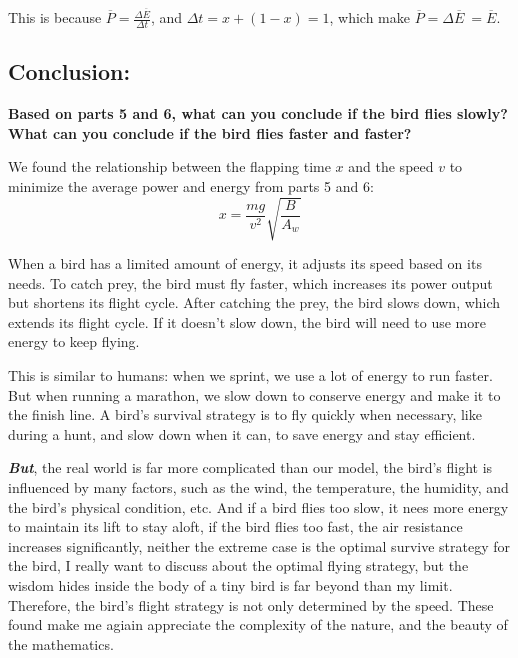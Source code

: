 \documentclass{article}
\begin{document}
This is because \(\overline{P}= \frac{{\Delta \overline{E}}}{\Delta t}\), and \(\Delta t = x + (1-x) =1\), which make \(\overline{P} = \Delta \overline{E}\ = \overline{E}\).

\subsection*{Conclusion:}
{\large \bfseries Based on parts 5 and 6, what can you conclude if the bird flies slowly? What can you conclude if the bird flies faster and faster?}

We found the relationship between the flapping time \(x\) and the speed \(v\) to minimize the average power and energy from parts 5 and 6:
\[x = \frac{mg}{v^2}\sqrt{\frac{B}{A_w}}\]

When a bird has a limited amount of energy, it adjusts its speed based on its needs. To catch prey, the bird must fly faster, which increases its power output but shortens its flight cycle. After catching the prey, the bird slows down, which extends its flight cycle. If it doesn’t slow down, the bird will need to use more energy to keep flying.

This is similar to humans: when we sprint, we use a lot of energy to run faster. But when running a marathon, we slow down to conserve energy and make it to the finish line. A bird’s survival strategy is to fly quickly when necessary, like during a hunt, and slow down when it can, to save energy and stay efficient.

\textbf{\textit{But}}, the real world is far more complicated than our model, the bird's flight is influenced by many factors, such as the wind, the temperature, the humidity, and the bird's physical condition, etc. And if a bird flies too slow, it nees more energy to maintain its lift to stay aloft, if the bird flies too fast, the air resistance increases significantly, neither the extreme case is the optimal survive strategy for the bird, I really want to discuss about the optimal flying strategy, but the wisdom hides inside the body of a tiny bird is far beyond than my limit. Therefore, the bird's flight strategy is not only determined by the speed. These found make me agiain appreciate the complexity of the nature, and the beauty of the mathematics.
\end{document}
